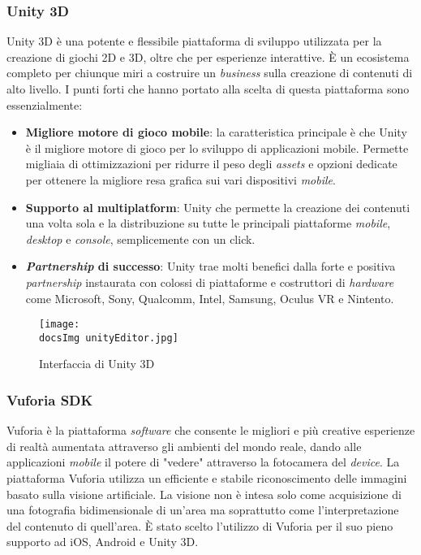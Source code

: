 \subsubsection{Unity 3D}
Unity 3D \`e una potente e flessibile piattaforma di sviluppo utilizzata per la creazione di giochi 2D e 3D, oltre che per esperienze interattive. \`E un ecosistema completo per chiunque miri a costruire un \textit{business\gloss} sulla creazione di contenuti di alto livello. I punti forti che hanno portato alla scelta di questa piattaforma sono essenzialmente:
\begin{itemize}
	\item \textbf{Migliore motore di gioco mobile}: la caratteristica principale \`e che Unity \`e il migliore motore di gioco per lo sviluppo di applicazioni mobile. Permette migliaia di ottimizzazioni per ridurre il peso degli \textit{assets\gloss} e opzioni dedicate per ottenere la migliore resa grafica sui vari dispositivi \textit{mobile}.
	\item \textbf{Supporto al multiplatform}: Unity che permette la creazione dei contenuti una volta sola e la distribuzione su tutte le principali piattaforme \textit{mobile}, \textit{desktop} e \textit{console}, semplicemente con un click.
	\item \textbf{\textit{Partnership} di successo}: Unity trae molti benefici dalla forte e positiva \textit{partnership} instaurata con colossi di piattaforme e costruttori di \textit{hardware} come Microsoft, Sony, Qualcomm, Intel, Samsung, Oculus VR e Nintento.
\end{itemize}  

\begin{figure}[H]
	\centering
	\texttt{[image: \\docsImg unityEditor.jpg]}
	\caption{Interfaccia di Unity 3D}
	\label{fig: Interfaccia di Unity 3D}
\end{figure}

\subsubsection{Vuforia SDK}
Vuforia è la piattaforma \textit{software\gloss} che consente le migliori e più creative esperienze di realtà aumentata attraverso gli ambienti del mondo reale, dando alle applicazioni \textit{mobile} il potere di "vedere" attraverso la fotocamera del \textit{device}.
La piattaforma Vuforia utilizza un efficiente e stabile riconoscimento delle immagini basato sulla visione artificiale. La visione non \`e intesa solo come acquisizione di una fotografia bidimensionale di un'area ma soprattutto come l'interpretazione del contenuto di quell'area.
\`E stato scelto l'utilizzo di Vuforia per il suo pieno supporto ad iOS, Android e Unity 3D.
\\


